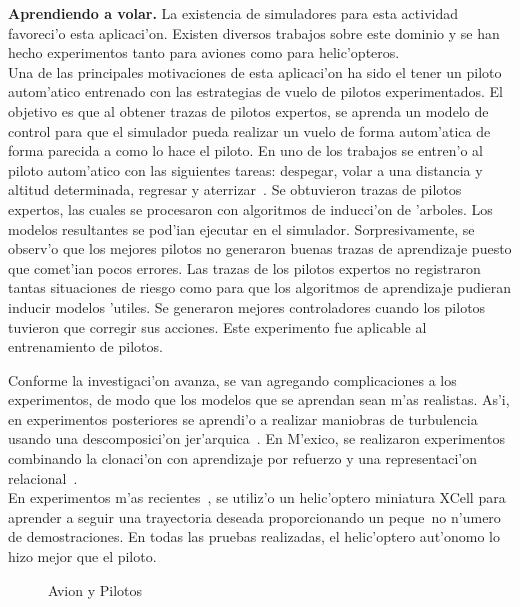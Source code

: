 \documentclass[11pt]{article}
\begin{document}
\textbf{Aprendiendo a volar.} La existencia de simuladores para esta actividad favoreci'o esta aplicaci'on. Existen diversos trabajos sobre este dominio y se han hecho experimentos tanto para aviones como para helic'opteros.\\
Una de las principales motivaciones de esta aplicaci'on ha sido el tener un piloto autom'atico entrenado con las estrategias de vuelo de pilotos experimentados. El objetivo es que al obtener trazas de pilotos expertos, se aprenda un modelo de control para que el simulador pueda realizar un vuelo de forma autom'atica de forma parecida a como lo hace el piloto.  En uno de los trabajos se entren'o al piloto autom'atico con las siguientes tareas: despegar, volar a una distancia y altitud determinada, regresar y aterrizar~\cite{Sammut92learningto}. Se obtuvieron trazas de pilotos expertos, las cuales se procesaron con algoritmos de inducci'on de 'arboles. Los modelos resultantes se pod'ian ejecutar en el simulador. Sorpresivamente, se observ'o que los mejores pilotos no generaron buenas trazas de aprendizaje puesto que comet'ian pocos errores. Las trazas de los pilotos expertos no registraron tantas situaciones de riesgo como para que los algoritmos de aprendizaje pudieran inducir modelos 'utiles. Se generaron mejores controladores cuando los pilotos tuvieron que corregir sus acciones. Este experimento fue aplicable al entrenamiento de pilotos.

Conforme la investigaci'on avanza, se van agregando complicaciones a los experimentos, de modo que los modelos que se aprendan sean m'as realistas. As'i, en experimentos posteriores se aprendi'o a realizar maniobras de turbulencia usando una descomposici'on jer'arquica~\cite{Isaac03goal-directedlearning}. En M'exico, se realizaron experimentos combinando la clonaci'on con aprendizaje por refuerzo y una representaci'on relacional~\cite{Morales04learningto}.\\
En experimentos m'as recientes~\cite{heliCoates}, se utiliz'o un helic'optero miniatura XCell para aprender a seguir una trayectoria deseada proporcionando un peque~no n'umero de demostraciones. En todas las pruebas realizadas, el helic'optero aut'onomo lo hizo mejor que el piloto. %

\begin{figure}[h]
\begin{center}

\caption{Avion y Pilotos}
  \label{fig:volar}
\end{center}
\end{figure} 
\end{document}
